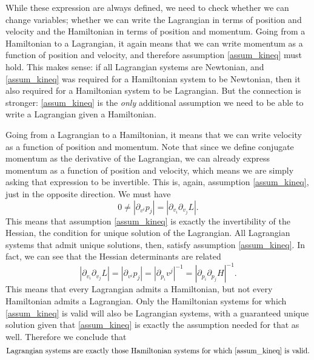 While these expression are always defined, we need to check whether we can change variables; whether we can write the Lagrangian in terms of position and velocity and the Hamiltonian in terms of position and momentum. Going from a Hamiltonian to a Lagrangian, it again means that we can write momentum as a function of position and velocity, and therefore assumption \ref{assum_kineq} must hold. This makes sense: if all Lagrangian systems are Newtonian, and \ref{assum_kineq} was required for a Hamiltonian system to be Newtonian, then it also required for a Hamiltonian system to be Lagrangian. But the connection is stronger: \ref{assum_kineq} is the \emph{only} additional assumption we need to be able to write a Lagrangian given a Hamiltonian.

Going from a Lagrangian to a Hamiltonian, it means that we can write velocity as a function of position and momentum. Note that since we define conjugate momentum as the derivative of the Lagrangian, we can already express momentum as a function of position and velocity, which means we are simply asking that expression to be invertible. This is, again, assumption \ref{assum_kineq}, just in the opposite direction. We must have
\begin{equation}
	0 \neq \left| \partial_{v^i} p_j \right| = \left| \partial_{v_i} \partial_{v_j} L \right|.
\end{equation}
This means that assumption \ref{assum_kineq} is exactly the invertibility of the Hessian, the condition for unique solution of the Lagrangian. All Lagrangian systems that admit unique solutions, then, satisfy assumption \ref{assum_kineq}. In fact, we can see that the Hessian determinants are related
\begin{equation}
	\left| \partial_{v_i} \partial_{v_j} L \right| = \left| \partial_{v^i} p_j \right| = \left| \partial_{p_i} v^j \right|^{-1} = \left|\partial_{p_i}\partial_{p_j} H\right|^{-1}.
\end{equation}
This means that every Lagrangian admits a Hamiltonian, but not every Hamiltonian admits a Lagrangian. Only the Hamiltonian systems for which \ref{assum_kineq} is valid will also be Lagrangian systems, with a guaranteed unique solution given that \ref{assum_kineq} is exactly the assumption needed for that as well. Therefore we conclude that
\begin{equation}
	\textrm{Lagrangian systems are exactly those Hamiltonian systems for which \ref{assum_kineq} is valid.}
\end{equation}

